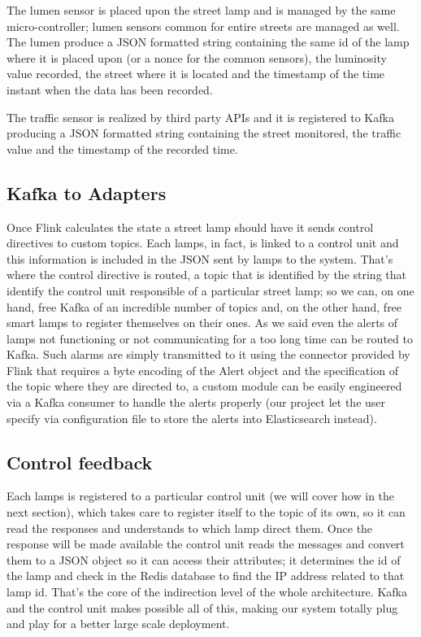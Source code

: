 The lumen sensor is placed upon the street lamp and is managed by the same micro-controller; lumen sensors common for entire streets are managed as well. The lumen produce a JSON formatted string containing the same id of the lamp where it is placed upon (or a nonce for the common sensors), the luminosity value recorded, the street where it is located and the timestamp of the time instant when the data has been recorded.

The traffic sensor is realized by third party APIs and it is registered to Kafka producing a JSON formatted string containing the street monitored, the traffic value and the timestamp of the recorded time.

\subsection{Kafka to Adapters}
Once Flink calculates the state a street lamp should have it sends control directives to custom topics. Each lamps, in fact, is linked to a control unit and this information is included in the JSON sent by lamps to the system. That’s where the control directive is routed, a topic that is identified by the string that identify the control unit responsible of a particular street lamp; so we can, on one hand, free Kafka of an incredible number of topics and, on the other hand, free smart lamps to register themselves on their ones. As we said even the alerts of lamps not functioning or not communicating for a too long time can be routed to Kafka. Such alarms are simply transmitted to it using the connector provided by Flink that requires a byte encoding of the Alert object and the specification of the topic where they are directed to, a custom module can be easily engineered via a Kafka consumer to handle the alerts properly (our project let the user specify via configuration file to store the alerts into Elasticsearch instead).

\subsection{Control feedback}
Each lamps is registered to a particular control unit (we will cover how in the next section), which takes care to register itself to the topic of its own, so it can read the responses and understands to which lamp direct them. Once the response will be made available the control unit reads the messages and convert them to a JSON object so it can access their attributes; it determines the id of the lamp and check in the Redis database to find the IP address related to that lamp id. That’s the core of the indirection level of the whole architecture. Kafka and the control unit makes possible all of this, making our system totally plug and play for a better large scale deployment.


